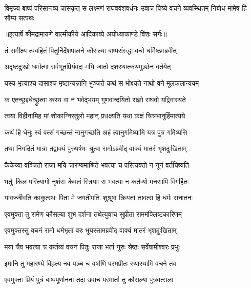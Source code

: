 \fourlineindentedshloka
{विमृज्य बाष्पं परिसान्त्व्य चासकृत्}
{स लक्ष्मणं राघववंशवर्धनः}
{उवाच पित्र्ये वचने व्यवस्थितम्}
{निबोध मामेष हि सौम्य सत्पथः} %


{॥इत्यार्षे श्रीमद्रामायणे वाल्मीकीये आदिकाव्ये अयोध्याकाण्डे विंशः सर्गः॥}


\twolineshloka
{तं समीक्ष्य त्ववहितं पितुर्निर्देशपालने}
{कौसल्या बाष्पसंरुद्धा वचो धर्मिष्ठमब्रवीत्} %

\twolineshloka
{अदृष्टदुःखो धर्मात्मा सर्वभूतप्रियंवदः}
{मयि जातो दशरथात्कथमुञ्छेन वर्तयेत्} %

\twolineshloka
{यस्य भृत्याश्च दासाश्च मृष्टान्यन्नानि भुञ्जते}
{कथं स भोक्ष्यते नाथो वने मूलफलान्ययम्} %

\twolineshloka
{क एतच्छ्रद्दधेच्छ्रुत्वा कस्य वा न भवेद्भयम्}
{गुणवान्दयितो राज्ञो राघवो यद्विवास्यते} %

\twolineshloka
{त्वया विहीनामिह मां शोकाग्निरतुलो महान्}
{प्रधक्ष्यति यथा कक्षं चित्रभानुर्हिमात्यये} %

\twolineshloka
{कथं हि धेनुः स्वं वत्सं गच्छन्तं नानुगच्छति}
{अहं त्वानुगमिष्यामि यत्र पुत्र गमिष्यसि} %

\twolineshloka
{तथा निगदितं मात्रा तद्वाक्यं पुरुषर्षभः}
{श्रुत्वा रामोऽब्रवीद् वाक्यं मातरं भृशदुःखिताम्} %

\twolineshloka
{कैकेय्या वञ्चितो राजा मयि चारण्यमाश्रिते}
{भवत्या च परित्यक्तो न नूनं वर्तयिष्यति} %

\twolineshloka
{भर्तुः किल परित्यागो नृशंसः केवलं स्त्रियाः}
{स भवत्या न कर्तव्यो मनसापि विगर्हितः} %

\twolineshloka
{यावज्जीवति काकुत्स्थः पिता मे जगतीपतिः}
{शुश्रूषा क्रियतां तावत्स हि धर्मः सनातनः} %

\twolineshloka
{एवमुक्ता तु रामेण कौसल्या शुभ दर्शना}
{तथेत्युवाच सुप्रीता राममक्लिष्टकारिणम्} %

\twolineshloka
{एवमुक्तस्तु वचनं रामो धर्मभृतां वरः}
{भूयस्तामब्रवीद् वाक्यं मातरं भृशदुःखिताम्} %

\twolineshloka
{मया चैव भवत्या च कर्तव्यं वचनं पितुः}
{राजा भर्ता गुरुः श्रेष्ठः सर्वेषामीश्वरः प्रभुः} %

\twolineshloka
{इमानि तु महारण्ये विहृत्य नव पञ्च च}
{वर्षाणि परमप्रीतः स्थास्यामि वचने तव} %

\twolineshloka
{एवमुक्ता प्रियं पुत्रं बाष्पपूर्णानना तदा}
{उवाच परमार्ता तु कौसल्या पुत्रवत्सला} %

